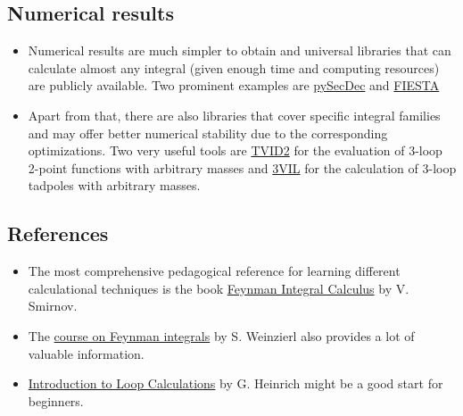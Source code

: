 \documentclass[../FeynCalcManual.tex]{subfiles}
\begin{document}
\hypertarget{numerical-results}{%
\subsection{Numerical results}\label{numerical-results}}

\begin{itemize}
\tightlist
\item
  Numerical results are much simpler to obtain and universal libraries
  that can calculate almost any integral (given enough time and
  computing resources) are publicly available. Two prominent examples
  are \href{https://secdec.readthedocs.io/en/stable/}{pySecDec} and
  \href{https://bitbucket.org/feynmanIntegrals/fiesta/src/master/}{FIESTA}
\item
  Apart from that, there are also libraries that cover specific integral
  families and may offer better numerical stability due to the
  corresponding optimizations. Two very useful tools are
  \href{https://sites.pitt.edu/~afreitas/}{TVID2} for the evaluation of
  3-loop 2-point functions with arbitrary masses and
  \href{https://www.niu.edu/spmartin/3VIL/}{3VIL} for the calculation of
  3-loop tadpoles with arbitrary masses.
\end{itemize}

\hypertarget{references}{%
\subsection{References}\label{references}}

\begin{itemize}
\tightlist
\item
  The most comprehensive pedagogical reference for learning different
  calculational techniques is the book
  \href{https://link.springer.com/book/10.1007/3-540-30611-0}{Feynman
  Integral Calculus} by V. Smirnov.
\item
  The \href{https://arxiv.org/pdf/2201.03593}{course on Feynman
  integrals} by S. Weinzierl also provides a lot of valuable
  information.
\item
  \href{https://www.ippp.dur.ac.uk/~gudrun/teaching/ILC.pdf}{Introduction
  to Loop Calculations} by G. Heinrich might be a good start for
  beginners.
\end{itemize}
\end{document}
